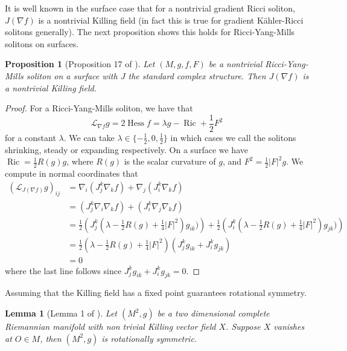 \documentclass[12pt, a4paper, reqno, oneside]{amsart}
\DeclareMathOperator{\Hess}{Hess}
\DeclareMathOperator{\Ric}{Ric}
\numberwithin{equation}{section}
\theoremstyle{plain}
\newtheorem{lemma}[theorem]{Lemma}
\newtheorem{proposition}[theorem]{Proposition}
\theoremstyle{definition}
\theoremstyle{plain}
\begin{document}
It is well known in the surface case that for a nontrivial gradient Ricci soliton, $J(\nabla f)$ is a nontrivial Killing field (in fact this is true for gradient K\"ahler-Ricci solitons generally). The next proposition shows this holds for Ricci-Yang-Mills solitons on surfaces. 
\begin{proposition}[Proposition 17 of \cite{streets_RicYMFlowSurfaces2009}]
  Let $(M,g,f,F)$ be a nontrivial Ricci-Yang-Mills soliton on a surface with $J$ the standard complex structure. Then $J(\nabla f)$ is a nontrivial Killing field.
\end{proposition}
\begin{proof}
  For a Ricci-Yang-Mills soliton, we have that
  \[
    \mathcal{L}_{\nabla f} g = 2\Hess f = \lambda g-\Ric+\frac{1}{2}F^{2}
  \]
  for a constant $\lambda$. We can take $\lambda \in \{-\tfrac{1}{2},0,\tfrac{1}{2}\}$ in which cases we call the solitons shrinking, steady or expanding respectively. On a surface we have $\Ric = \tfrac{1}{2}R(g)g$, where $R(g)$ is the scalar curvature of $g$, and $F^2=\tfrac{1}{2}|F|^{2}g$. We compute in normal coordinates that
  \begin{align*}
    (\mathcal{L}_{J(\nabla f)}g)_{ij} &= \nabla_{i}\left(J_{j}^{k}\nabla_{k}f\right)+\nabla_{j}\left(J_{i}^{k}\nabla_{k}f\right)\\
      &= \left(J_{j}^{k}\nabla_{i}\nabla_{k}f\right)+\left(J_{i}^{k}\nabla_{j}\nabla_{k}f\right)\\
      &= \tfrac{1}{2}\left(J_{j}^{k}(\lambda-\tfrac{1}{2}R(g)+\tfrac{1}{4}|F|^{2})g_{ik})\right)+\tfrac{1}{2}\left(J_{i}^{k}(\lambda-\tfrac{1}{2}R(g)+\tfrac{1}{4}|F|^{2})g_{jk})\right)\\
      &= \tfrac{1}{2}(\lambda-\tfrac{1}{2}R(g)+\tfrac{1}{4}|F|^{2})\left(J_{j}^{k}g_{ik}+J_{i}^{k}g_{jk}\right)\\
      &= 0
  \end{align*}
  where the last line follows since $J_{j}^{k}g_{ik}+J_{i}^{k}g_{jk}=0$.
\end{proof}

Assuming that the Killing field has a fixed point guarantees rotational symmetry.
\begin{lemma}[Lemma 1 of \cite{chen_NoteUniformRiemSurf2006}]\label{fix_point_rot_sym_lemma}
  Let $(M^{2},g)$ be a two dimensional complete Riemannian manifold with non trivial Killing vector field $X$. Suppose $X$ vanishes at $O\in M$, then $(M^{2},g)$ is rotationally symmetric.
\end{lemma}
\end{document}
